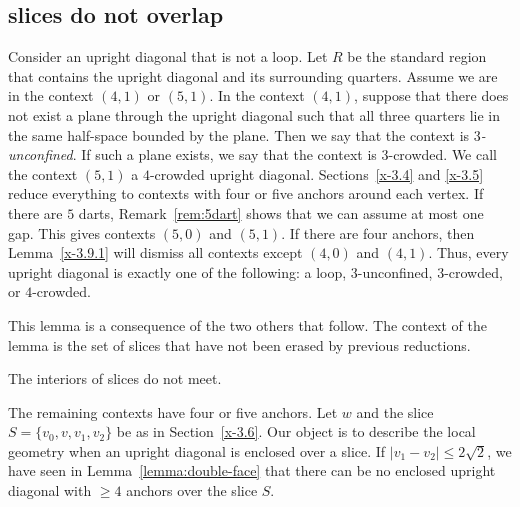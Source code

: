 \subsection{slices do not overlap} %



\begin{definition}
Consider an upright diagonal that is not a loop. Let $R$ be the
standard region that contains the upright diagonal and its
surrounding quarters.  Assume we are in the context $(4,1)$ or
$(5,1)$.  In the context $(4,1)$, suppose that there does not exist
a plane through the upright diagonal such that all three quarters
lie in the same half-space bounded by the plane. Then we say that
the context is {\it $3$-unconfined}. If such a plane exists, we say
that the context is $3$-crowded. We call the context $(5,1)$ a
$4$-crowded upright diagonal. Sections~\ref{x-3.4} and \ref{x-3.5}
reduce everything to contexts with four or five anchors around each
vertex.  If there are $5$ darts, 
Remark~\ref{rem:5dart} shows that we can assume at most one
gap. This gives contexts $(5,0)$ and $(5,1)$.  If there are four
anchors, then Lemma~\ref{x-3.9.1} will dismiss all contexts except
$(4,0)$ and $(4,1)$. Thus, every upright diagonal is exactly one of
the following: a loop, $3$-unconfined, $3$-crowded, or $4$-crowded.
\end{definition}


This lemma is a consequence of the two others that follow. The
context of the lemma is the set of slices that have
not been erased by previous reductions.

\begin{lemma}
    \label{lemma:anchor-no-overlap}
The interiors of slices do not meet.
\end{lemma}

The remaining contexts have four or  five anchors. Let $w$ and the
slice $S=\{v_0,v,v_1,v_2\}$ be as in Section~\ref{x-3.6}.
Our object is to describe the local geometry when an upright
diagonal is enclosed over a slice. If $|v_1-v_2|\le
2\sqrt{2}$, we have seen in Lemma~\ref{lemma:double-face} that
there can be no enclosed upright diagonal with $\ge 4$ anchors
over the slice $S$.

